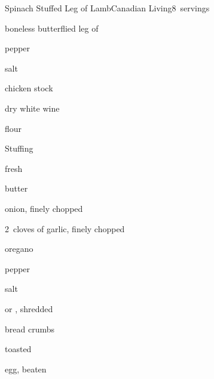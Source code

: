 \begin{recipe}{Spinach Stuffed Leg of Lamb}{Canadian Living}{8~servings}

\begin{ingredients}
\item {} boneless butterflied leg of 
\item \tp{\half} pepper
\item \tp{\quarter} salt
\item {} chicken stock
\item \C{\quarter} dry white wine
\item {} flour
\end{ingredients}

Stuffing
\begin{ingredients}
\item {} fresh 
\item {} butter
\item onion, finely chopped
\item 2~cloves of garlic, finely chopped
\item {} oregano
\item \tp{\half} pepper
\item \tp{\quarter} salt
\item \C{\half}  or , shredded
\item \C{\half} bread crumbs
\item \C{\third} toasted 
\item egg, beaten
\end{ingredients}


\end{recipe}
